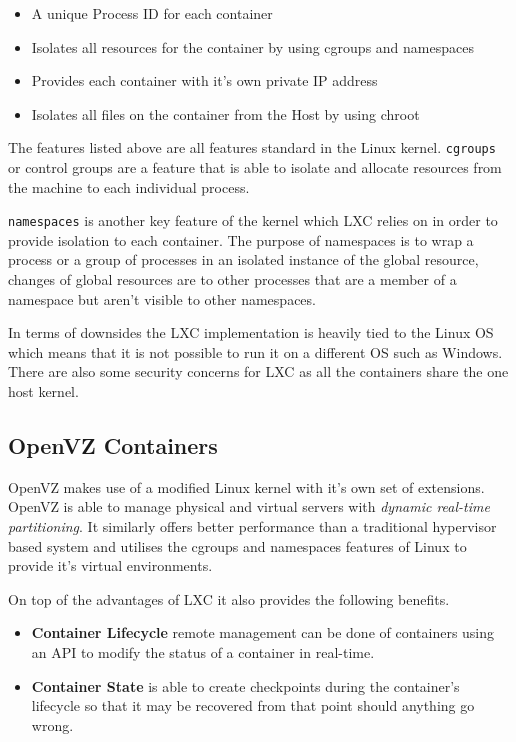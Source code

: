 \begin{itemize}
    \item A unique Process ID for each container
    \item Isolates all resources for the container by using cgroups and namespaces
    \item Provides each container with it's own private IP address
    \item Isolates all files on the container from the Host by using chroot
\end{itemize}

The features listed above are all features standard in the Linux kernel. \texttt{cgroups} \cite{cgroups-man} or control groups are a feature that is able to isolate and allocate resources from the machine to each individual process. 

\texttt{namespaces} \cite{namespaces-man} is another key feature of the kernel which LXC relies on in order to provide isolation to each container. The purpose of namespaces is to wrap a process or a group of processes in an isolated instance of the global resource, changes of global resources are to other processes that are a member of a namespace but aren't visible to other namespaces.

In terms of downsides the LXC implementation is heavily tied to the Linux OS which means that it is not possible to run it on a different OS such as Windows. There are also some security concerns for LXC as all the containers share the one host kernel.

\subsection{OpenVZ Containers}

OpenVZ makes use of a modified Linux kernel with it's own set of extensions. OpenVZ is able to manage physical and virtual servers with \textit{dynamic real-time partitioning}. It similarly offers better performance than a traditional hypervisor based system and utilises the cgroups and namespaces features of Linux to provide it's virtual environments.

On top of the advantages of LXC it also provides the following benefits.

\begin{itemize}
    \item \textbf{Container Lifecycle} remote management can be done of containers using an API to modify the status of a container in real-time. 
    \item \textbf{Container State} is able to create checkpoints during the container's lifecycle so that it may be recovered from that point should anything go wrong.
\end{itemize}

